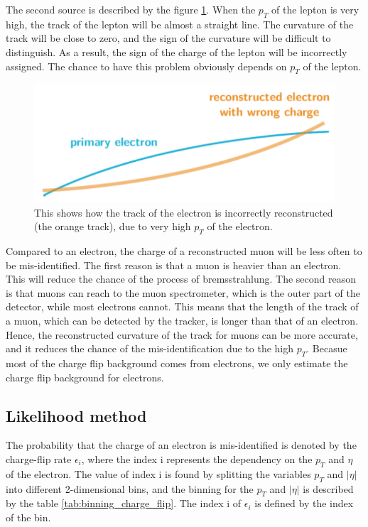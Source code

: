 The second source is described by the figure \ref{fig:charge_flip_high_pt}.
When the $p_T$ of the lepton is very high, the track of the lepton will be almost a straight line.
The curvature of the track will be close to zero, and the sign of the curvature will be difficult to distinguish.
As a result, the sign of the charge of the lepton will be incorrectly assigned.
The chance to have this problem obviously depends on $p_T$ of the lepton.

\begin{figure}
\centering
\includegraphics[width=\textwidth]{data/photo/charge_flip/WrongTrack.png}
\caption{This shows how the track of the electron is incorrectly reconstructed (the orange track), due to very high $p_T$ of the electron.}
\label{fig:charge_flip_high_pt}
\end{figure}

Compared to an electron, the charge of a reconstructed muon will be less often to be mis-identified.
The first reason is that a muon is heavier than an electron.
This will reduce the chance of the process of bremsstrahlung.
The second reason is that muons can reach to the muon spectrometer, which is the outer part of the detector, while most electrons cannot.
This means that the length of the track of a muon, which can be detected by the tracker, is longer than that of an electron.
Hence, the reconstructed curvature of the track for muons can be more accurate, and it reduces the chance of the mis-identification due to the high $p_T$.
Becasue most of the charge flip background comes from electrons, we only estimate the charge flip background for electrons.

\subsection{Likelihood method}
\label{sec:likelihood_method}
The probability that the charge of an electron is mis-identified is denoted by the charge-flip rate $\epsilon_i$, where the index i represents the dependency on the $p_T$ and $\eta$ of the electron.
The value of index i is found by splitting the variables $p_T$ and $|\eta|$ into different 2-dimensional bins, and the binning for the $p_T$ and $|\eta|$ is described by the table \ref{tab:binning_charge_flip}. The index i of $\epsilon_i$ is defined by the index of the bin.

